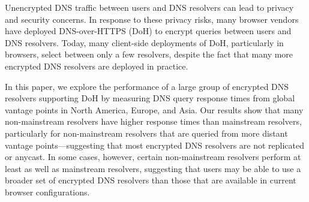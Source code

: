 Unencrypted DNS traffic between users and DNS resolvers can lead to privacy and security concerns. In response to these privacy risks, many browser vendors have deployed DNS-over-HTTPS (DoH) to encrypt queries between users and DNS resolvers. Today, many client-side deployments of DoH, particularly in browsers, select between only a few resolvers, despite the fact that many more encrypted DNS resolvers are deployed in practice.

In this paper, we explore the performance of a large group of encrypted DNS resolvers supporting DoH by measuring DNS query response times from global vantage points in North America, Europe, and Asia. Our results show that many non-mainstream resolvers have higher response times than mainstream resolvers, particularly for non-mainstream resolvers that are queried from more distant vantage points---suggesting that most encrypted DNS resolvers are not replicated or anycast. In some cases, however, certain non-mainstream resolvers perform at least as well as mainstream resolvers, suggesting that users may be able to use a broader set of encrypted DNS resolvers than those that are available in current browser configurations.